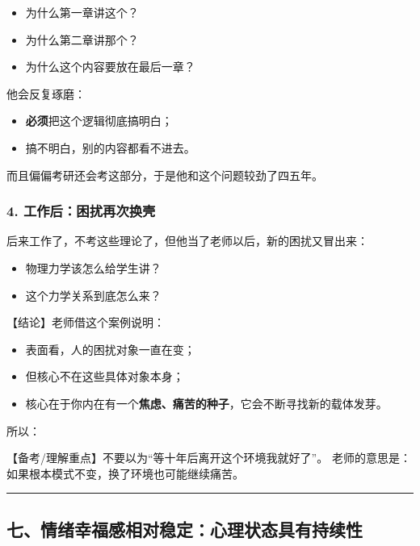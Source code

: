 \documentclass[
  chinese,
  9pt,
  a4paper,
]{ctexart}
\providecommand{\tightlist}{%
  \setlength{\itemsep}{0pt}\setlength{\parskip}{0pt}}
\begin{document}
\begin{itemize}
\tightlist
\item
  为什么第一章讲这个？
\item
  为什么第二章讲那个？
\item
  为什么这个内容要放在最后一章？
\end{itemize}

他会反复琢磨：

\begin{itemize}
\tightlist
\item
  \textbf{必须}把这个逻辑彻底搞明白；
\item
  搞不明白，别的内容都看不进去。
\end{itemize}

而且偏偏考研还会考这部分，于是他和这个问题较劲了四五年。

\subsubsection{4.
工作后：困扰再次换壳}\label{ux5de5ux4f5cux540eux56f0ux6270ux518dux6b21ux6362ux58f3}

后来工作了，不考这些理论了，但他当了老师以后，新的困扰又冒出来：

\begin{itemize}
\tightlist
\item
  物理力学该怎么给学生讲？
\item
  这个力学关系到底怎么来？
\end{itemize}

【结论】老师借这个案例说明：

\begin{itemize}
\tightlist
\item
  表面看，人的困扰对象一直在变；
\item
  但核心不在这些具体对象本身；
\item
  核心在于你内在有一个\textbf{焦虑、痛苦的种子}，它会不断寻找新的载体发芽。
\end{itemize}

所以：

【备考/理解重点】不要以为``等十年后离开这个环境我就好了''。
老师的意思是：如果根本模式不变，换了环境也可能继续痛苦。

\begin{center}\rule{0.5\linewidth}{0.5pt}\end{center}

\subsection{七、情绪幸福感相对稳定：心理状态具有持续性}\label{ux4e03ux60c5ux7eeaux5e78ux798fux611fux76f8ux5bf9ux7a33ux5b9aux5fc3ux7406ux72b6ux6001ux5177ux6709ux6301ux7eedux6027}
\end{document}

